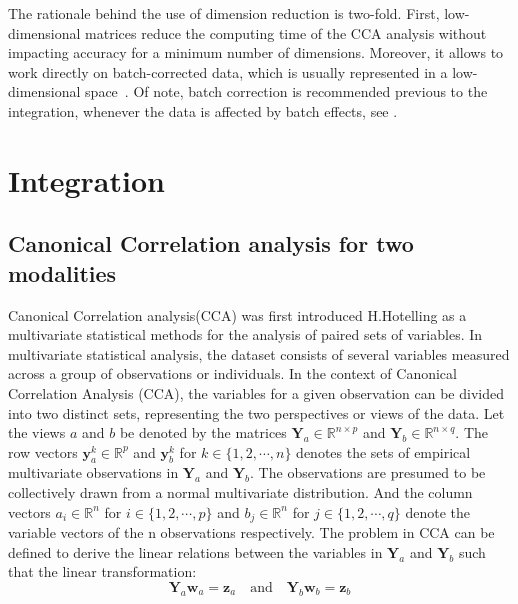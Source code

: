The rationale behind the use of dimension reduction is two-fold. First, low-dimensional matrices reduce the computing time of the CCA analysis without impacting accuracy for a minimum number of dimensions. Moreover, it allows to work directly on batch-corrected data, which is usually represented in a low-dimensional space~\cite{hao2021seurat4, korsunsky2019harmony}. Of note, batch correction is recommended previous to the integration, whenever the data is affected by batch effects, see .

\section{Integration}
\label{methods:integration:alg}
\subsection{Canonical Correlation analysis for two modalities}
Canonical Correlation analysis(CCA) was first introduced H.Hotelling\citep{hotelling1935cca1,HOTELLING1936cca2} as a multivariate statistical methods for the analysis of paired sets of variables. In multivariate statistical analysis, the dataset consists of several variables measured across a group of observations or individuals. In the context of Canonical Correlation Analysis (CCA), the variables for a given observation can be divided into two distinct sets, representing the two perspectives or views of the data. Let the views $a$ and $b$ be denoted by the matrices $\mathbf{Y}_a\in\mathbb{R}^{n\times p}$ and $\mathbf{Y}_b\in \mathbb{R}^{n\times q}$. The row vectors $\mathbf{y}_a^k\in \mathbb{R}^{p}$ and $\mathbf{y}_b^k$ for $k\in\{1,2,\cdots, n\}$ denotes the sets of empirical multivariate observations in $\mathbf{Y}_a$ and $\mathbf{Y}_b$. The observations are presumed to be collectively drawn from a normal multivariate distribution. And the column vectors $a_i\in \mathbb{R}^n$ for $i\in \{1,2,\cdots, p\}$ and $b_j\in \mathbb{R}^n$ for ${j\in \{1,2,\cdots, q\}}$ denote the variable vectors of the n observations respectively. The problem in CCA can be defined to derive the linear relations between the variables in $\mathbf{Y}_a$ and $\mathbf{Y}_b$ such that the linear transformation:
\begin{equation}
\mathbf{Y}_a\mathbf{w}_a=\mathbf{z}_a\quad\text{and}\quad \mathbf{Y}_b\mathbf{w}_b=\mathbf{ z}_b
\end{equation}


